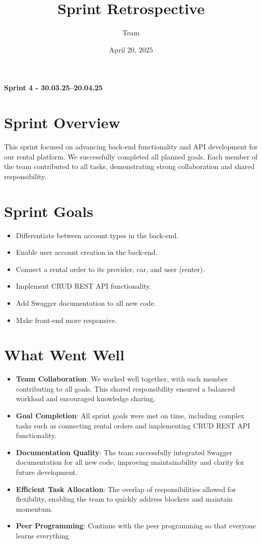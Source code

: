 \documentclass[a4paper,12pt]{article}
\title{Sprint Retrospective}
\author{Team}
\date{April 20, 2025}
\begin{document}
\maketitle
\textbf{Sprint 4 - 30.03.25–20.04.25} 

\section*{Sprint Overview}
This sprint focused on advancing back-end functionality and API development for our rental platform. We successfully completed all planned goals. Each member of the team contributed to all tasks, demonstrating strong collaboration and shared responsibility.

\section*{Sprint Goals}
\begin{itemize}
    \item Differentiate between account types in the back-end.
    \item Enable user account creation in the back-end.
    \item Connect a rental order to its provider, car, and user (renter).
    \item Implement CRUD REST API functionality.
    \item Add Swagger documentation to all new code.
    \item Make front-end more responsive.
\end{itemize}

\section*{What Went Well}
\begin{itemize}
    \item \textbf{Team Collaboration}: We worked well together, with each member contributing to all goals. This shared responsibility ensured a balanced workload and encouraged knowledge sharing.
    \item \textbf{Goal Completion}: All sprint goals were met on time, including complex tasks such as connecting rental orders and implementing CRUD REST API functionality.
    \item \textbf{Documentation Quality}: The team successfully integrated Swagger documentation for all new code, improving maintainability and clarity for future development.
    \item \textbf{Efficient Task Allocation}: The overlap of responsibilities allowed for flexibility, enabling the team to quickly address blockers and maintain momentum.
    \item \textbf{Peer Programming}: Continue with the peer programming so that everyone learns everything
\end{itemize}
\end{document}
